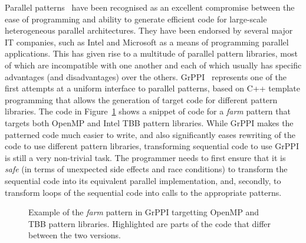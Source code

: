 Parallel patterns~\cite{Asanovic:2009:VPC} have been recognised as an excellent compromise between the ease of programming and ability to generate efficient code for large-scale heterogeneous parallel architectures. They have been endorsed by several major IT companies, such as Intel and Microsoft as a means of programming parallel applications. This has given rise to a multitude of parallel pattern libraries, most of which are incompatible with one another and each of which usually has specific advantages (and disadvantages) over the others. GrPPI~\cite{DBLP:journals/concurrency/AstorgaD0G17} represents one of the first attempts at a uniform interface to parallel patterns, based on C++ template programming that allows the generation of target code for different pattern libraries. The code in Figure~\ref{fig:grppiExample} shows a snippet of code for a \emph{farm} pattern that targets both OpenMP and Intel TBB pattern libraries. While GrPPI makes the patterned code much easier to write, and also significantly eases rewriting of the code to use different pattern libraries, transforming sequential code to use GrPPI is still a very non-trivial task. The programmer needs to first ensure that it is \emph{safe} (in terms of unexpected side effects and race conditions) to transform the sequential code into its equivalent parallel implementation, and, secondly, to transform loops of the sequential code into calls to the appropriate patterns. 

\begin{figure}[t]
\centering
{}
\caption{Example of the \emph{farm} pattern in GrPPI targetting OpenMP and TBB pattern libraries. Highlighted are parts of the code that differ between the two versions.}
\label{fig:grppiExample}
\end{figure}

